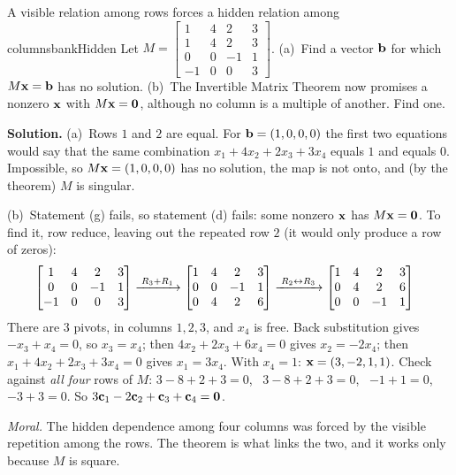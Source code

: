\documentclass[11pt]{article}
\begin{document}
\begin{exmp}{A visible relation among rows forces a hidden relation among columns}{bankHidden}
Let $M=\begin{bmatrix}1&4&2&3\\1&4&2&3\\0&0&-1&1\\-1&0&0&3\end{bmatrix}$. (a)~Find a vector $\mathbf{b}$ for which $M\mathbf{x}=\mathbf{b}$ has no solution. (b)~The Invertible Matrix Theorem now promises a nonzero $\mathbf{x}$ with $M\mathbf{x}=\mathbf{0}$, although no column is a multiple of another. Find one.

\textbf{Solution.} (a)~Rows $1$ and $2$ are equal. For $\mathbf{b}=(1,0,0,0)$ the first two equations would say that the same combination $x_1+4x_2+2x_3+3x_4$ equals $1$ and equals $0$. Impossible, so $M\mathbf{x}=(1,0,0,0)$ has no solution, the map is not onto, and (by the theorem) $M$ is singular.

(b)~Statement (g) fails, so statement (d) fails: some nonzero $\mathbf{x}$ has $M\mathbf{x}=\mathbf{0}$. To find it, row reduce, leaving out the repeated row $2$ (it would only produce a row of zeros):
\begin{align*}
&\begin{bmatrix}1&4&2&3\\0&0&-1&1\\-1&0&0&3\end{bmatrix}
\xrightarrow{\;R_3+R_1\;}
\begin{bmatrix}1&4&2&3\\0&0&-1&1\\0&4&2&6\end{bmatrix}
\xrightarrow{\;R_2\leftrightarrow R_3\;}
\begin{bmatrix}1&4&2&3\\0&4&2&6\\0&0&-1&1\end{bmatrix}
\end{align*}
There are $3$ pivots, in columns $1,2,3$, and $x_4$ is free. Back substitution gives $-x_3+x_4=0$, so $x_3=x_4$; then $4x_2+2x_3+6x_4=0$ gives $x_2=-2x_4$; then $x_1+4x_2+2x_3+3x_4=0$ gives $x_1=3x_4$. With $x_4=1$: $\mathbf{x}=(3,-2,1,1)$. Check against \emph{all four} rows of $M$: $3-8+2+3=0$, \ $3-8+2+3=0$, \ $-1+1=0$, \ $-3+3=0$. So $3\mathbf{c}_1-2\mathbf{c}_2+\mathbf{c}_3+\mathbf{c}_4=\mathbf{0}$.

\emph{Moral.} The hidden dependence among four columns was forced by the visible repetition among the rows. The theorem is what links the two, and it works only because $M$ is square.
\end{exmp}
\end{document}
